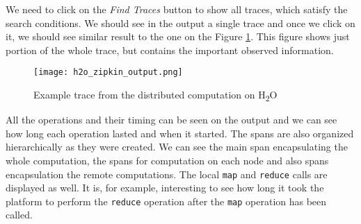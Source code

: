 We need to click on the \textit{Find Traces} button to show all traces, which satisfy the search conditions. We should see in the output a single trace and once we click on it, we should see similar result to the one on the Figure \ref{h2o_zipkin_output}. This figure shows just portion of the whole trace, but contains the important observed information.
	\begin{figure}
		\centering
		\texttt{[image: h2o\_zipkin\_output.png]}
		\caption{Example trace from the distributed computation on H\textsubscript{2}O}
		\label{h2o_zipkin_output}
	\end{figure}

All the operations and their timing can be seen on the output and we can see how long each operation lasted and when it started. The spans are also organized hierarchically as they were created. We can see the main span encapsulating the whole computation, the spans for computation on each node and also spans encapsulation the remote computations. The local \texttt{map} and \texttt{reduce} calls are displayed as well. It is, for example, interesting to see how long it took the platform to perform the \texttt{reduce} operation after the \texttt{map} operation has been called.